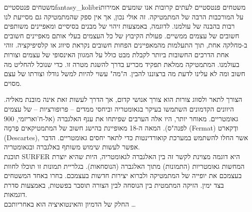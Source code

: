 \begin{surferIntroPage}{משטחים פנטסטיים}{fantasy_kolibri}{משטחים פנטסטיים}
לעתים קרובות אנו שומעים אמירות על המורכבות הרבה של המתמטיקה. זה אולי נכון, אך אין ספק שהמתמטיקה גם מסייעת לנו רבות בהבנה של עולמנו. לדוגמה, באמצעות זיהוי של מבנים בסיסיים ומאפיינים משותפים חשובים של עצמים ממשיים. פעולת הקיבוץ של כל העצמים בעלי אותם מאפיינים חשובים ב-\textit{מחלקה} אחת, תוך התעלמות מהמאפיינים הפחות חשובים נקראת סיווג או קלסיפיקציה. זוהי אחת הדרכים החשובות ביותר לקבלת מבט כולל על המגוון האינסופי של עצמים וצורות בעולמנו. המתמטיקה ממלאת תפקיד מכריע בדרך להשגת מטרה זו. כדי שנוכל להחליט מה חשוב ומה לא עלינו לדעת מה ברצוננו להבין. ה"מה" עשוי להיות למשל גודלו וצורתו של עצם מסוים.
\\

\vspace{0,4cm}

הצורך לתאר ולסווג צורות הוא צורך אנושי קדום, אך הדרך לעשות זאת אינה מובנת מאליה. היוונים הקדמונים השתמשו בעיקר בגאומטריה וביחסי ממדים – פרופורציות – של עצמים גאומטריים. מאוחר יותר, היו אלה הערבים שפיתחו את ענף האלגברה (אל-ח'ואריזמי, 900 לפנה"ס). המאה ה-18 מאופיינת בהישג חשוב של המתמטיקאים פֶרמָה (Fermat) ודֶקארט (Descartes), אשר החלו להשתמש במערכת קואורדינטות כדי לתאר יחסים גאומטריים. הדבר אפשר לעשות שימוש משותף באלגברה ובגאומטריה.
\\
\vspace{0,4cm}
תוכנת SURFER היא דוגמה מצוינת לקשר זה בין האלגברה לגאומטריה, היות שהיא יוצרת המחשות גאומטריות (התמונות) מתוך האלגברה (הנוסחאות).
בגלריית תמונות זו תוכלו לחוות בעצמכם את יופייה של המתמטיקה ולברוא יצירות חדשות בעצמכם. בחרו באחד המשטחים בצד ימין. הזיקה המתמטית בין הנוסחה לבין הצורה תוסבר בפשטות, באמצעות סדרת דוגמאות.\\
החלק של הדמיון והאינטואיציה הוא באחריותכם \dots
\end{surferIntroPage}
